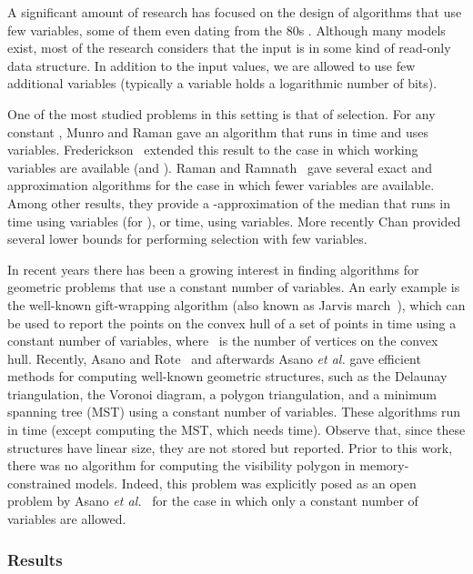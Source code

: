 \documentclass[a4paper]{article}
\begin{document}
A significant amount of research has focused on the design of algorithms that use few variables, some of them even dating from the 80s \cite{mp-ssls-80}. Although many models exist, most of the research considers that the input is in some kind of read-only data structure. In addition to the input values, we are allowed to use few additional variables (typically a variable holds a logarithmic number of bits). 

One of the most studied problems in this setting is that of selection. For any constant , Munro and Raman \cite{mr-sromswmdm-96} gave an algorithm that runs in  time and uses  variables. Frederickson~\cite{Frederickson87} extended this result to the case in which  working variables are available (and ). Raman and Ramnath~\cite{rr-iubtstsls-98} gave several exact and approximation algorithms for the case in which fewer variables are available. Among other results, they provide a -approximation of the median that runs in  time using  variables (for ), or  time, using  variables. More recently Chan \cite{Chan} provided several lower bounds for performing selection with few variables. 

In recent years there has been a growing interest in finding algorithms for geometric problems that use a constant number of variables.
An early example is the well-known gift-wrapping algorithm (also known as Jarvis march~\cite{j-ich-73}), which can be used to  report the points on the convex hull of a set of  points in  time using a constant number of variables, where \Hout\ is the number of vertices on the convex hull. 
Recently, Asano and Rote~\cite{ar-cwagp-09} and afterwards Asano {\em et al.} \cite{amw-cwaspsp-10,abbkmrs-mcasp-11} gave efficient methods for computing well-known geometric structures, such as the Delaunay triangulation, the Voronoi diagram, a polygon triangulation, and a minimum spanning tree (MST) using a constant number of variables. These algorithms run in  time (except computing the MST, which needs  time). Observe that, since these structures have linear size, they are not stored but reported. Prior to this work, there was no algorithm for computing the visibility polygon in memory-constrained models. Indeed, this problem was explicitly posed as an open problem by Asano {\em et al.}~\cite{amrw-cwagp-10} for the case in which only a constant number of variables are allowed. 



\subsubsection*{Results}
\end{document}
